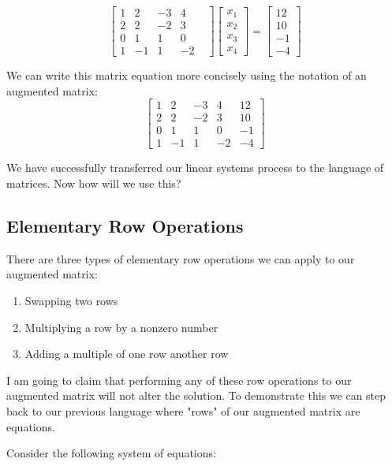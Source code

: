 \documentclass{article}
\begin{document}
\[
\begin{bmatrix}
    1 & 2 & -3 & 4 & \\
    2 & 2 & -2 & 3 & \\
    0 & 1 & 1 & 0 & \\
    1 & -1 & 1 & -2 & 
\end{bmatrix}
\begin{bmatrix}
    x_1 \\
    x_2 \\
    x_3 \\
    x_4
\end{bmatrix}
=
\begin{bmatrix}
    12 \\
    10 \\
    -1 \\
    -4
\end{bmatrix}
\]

We can write this matrix equation more concisely using the notation of an augmented matrix:
\[
\left[ 
    \begin{array}{cccc|c}
    1 & 2 & -3 & 4 & 12 \\
    2 & 2 & -2 & 3 & 10 \\
    0 & 1 & 1 & 0 & -1 \\
    1 & -1 & 1 & -2 & -4
    \end{array}
\right]
\]

We have successfully transferred our linear systems process to the language of matrices. Now how will we use this? 

\newpage

\subsection*{Elementary Row Operations}

There are three types of elementary row operations we can apply to our augmented matrix:
\begin{enumerate}
    \item Swapping two rows
    \item Multiplying a row by a nonzero number
    \item Adding a multiple of one row another row
\end{enumerate}
I am going to claim that performing any of these row operations to our augmented matrix will not alter the solution. To demonstrate this we can step back to our previous language where "rows" of our augmented matrix are equations.

Consider the following system of equations:
\end{document}
